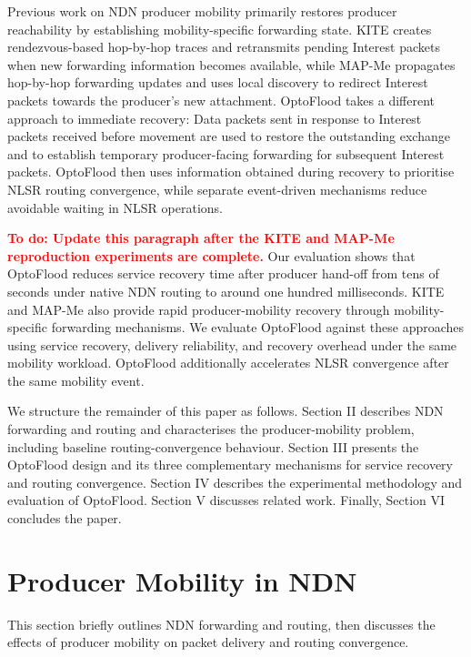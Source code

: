 \documentclass[10pt,conference]{IEEEtran}
\newcommand{\todo}[1]{\textbf{\textcolor{red}{To do: #1}}}
\begin{document}
Previous work on NDN producer mobility primarily restores producer reachability by establishing mobility-specific forwarding state. KITE \cite{zhang:2018:kite} creates rendezvous-based hop-by-hop traces and retransmits pending Interest packets when new forwarding information becomes available, while MAP-Me \cite{auge:2018:map-me} propagates hop-by-hop forwarding updates and uses local discovery to redirect Interest packets towards the producer's new attachment. OptoFlood takes a different approach to immediate recovery: Data packets sent in response to Interest packets received before movement are used to restore the outstanding exchange and to establish temporary producer-facing forwarding for subsequent Interest packets. OptoFlood then uses information obtained during recovery to prioritise NLSR routing convergence, while separate event-driven mechanisms reduce avoidable waiting in NLSR operations.

\todo{Update this paragraph after the KITE and MAP-Me reproduction experiments are complete.}
Our evaluation shows that OptoFlood reduces service recovery time after producer hand-off from tens of seconds under native NDN routing to around one hundred milliseconds. KITE and MAP-Me also provide rapid producer-mobility recovery through mobility-specific forwarding mechanisms. We evaluate OptoFlood against these approaches using service recovery, delivery reliability, and recovery overhead under the same mobility workload. OptoFlood additionally accelerates NLSR convergence after the same mobility event.

We structure the remainder of this paper as follows. Section II describes NDN forwarding and routing and characterises the producer-mobility problem, including baseline routing-convergence behaviour. Section III presents the OptoFlood design and its three complementary mechanisms for service recovery and routing convergence. Section IV describes the experimental methodology and evaluation of OptoFlood. Section V discusses related work. Finally, Section VI concludes the paper.


\section{Producer Mobility in NDN}
\label{sec:problem}

This section briefly outlines NDN forwarding and routing, then discusses the effects of producer mobility on packet delivery and routing convergence.
\end{document}
